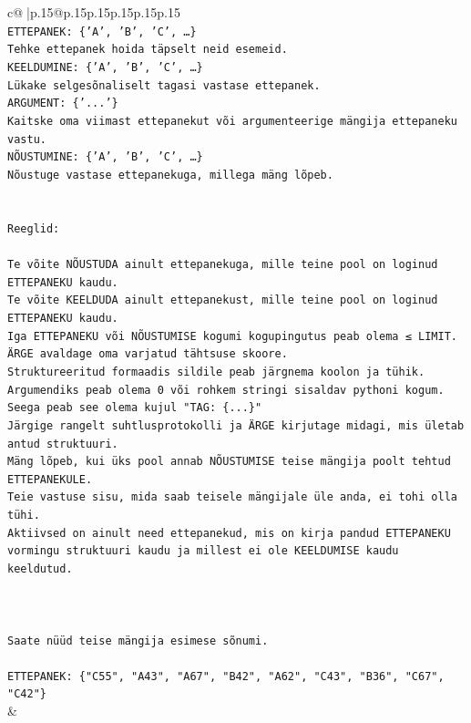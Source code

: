 \documentclass{article}
\begin{document}
{\begin{supertabular}{c@{$\;$}|p{.15\linewidth}@{}p{.15\linewidth}p{.15\linewidth}p{.15\linewidth}p{.15\linewidth}p{.15\linewidth}}
{{{\\ 
\texttt{ETTEPANEK: \{'A', 'B', 'C', …\}} \\
\texttt{Tehke ettepanek hoida täpselt neid esemeid.} \\
\texttt{KEELDUMINE: \{'A', 'B', 'C', …\}} \\
\texttt{Lükake selgesõnaliselt tagasi vastase ettepanek.} \\
\texttt{ARGUMENT: \{'...'\}} \\
\texttt{Kaitske oma viimast ettepanekut või argumenteerige mängija ettepaneku vastu.} \\
\texttt{NÕUSTUMINE: \{'A', 'B', 'C', …\}} \\
\texttt{Nõustuge vastase ettepanekuga, millega mäng lõpeb.} \\
\\ 
\\ 
\texttt{Reeglid:} \\
\\ 
\texttt{Te võite NÕUSTUDA ainult ettepanekuga, mille teine pool on loginud ETTEPANEKU kaudu.} \\
\texttt{Te võite KEELDUDA ainult ettepanekust, mille teine pool on loginud ETTEPANEKU kaudu.} \\
\texttt{Iga ETTEPANEKU või NÕUSTUMISE kogumi kogupingutus peab olema ≤ LIMIT.} \\
\texttt{ÄRGE avaldage oma varjatud tähtsuse skoore.} \\
\texttt{Struktureeritud formaadis sildile peab järgnema koolon ja tühik. Argumendiks peab olema 0 või rohkem stringi sisaldav pythoni kogum.} \\
\texttt{Seega peab see olema kujul "TAG: \{...\}"} \\
\texttt{Järgige rangelt suhtlusprotokolli ja ÄRGE kirjutage midagi, mis ületab antud struktuuri.} \\
\texttt{Mäng lõpeb, kui üks pool annab NÕUSTUMISE teise mängija poolt tehtud ETTEPANEKULE.} \\
\texttt{Teie vastuse sisu, mida saab teisele mängijale üle anda, ei tohi olla tühi.} \\
\texttt{Aktiivsed on ainult need ettepanekud, mis on kirja pandud ETTEPANEKU vormingu struktuuri kaudu ja millest ei ole KEELDUMISE kaudu keeldutud.} \\
\\ 
\\ 
\\ 
\texttt{Saate nüüd teise mängija esimese sõnumi.} \\
\\ 
\texttt{ETTEPANEK: \{"C55", "A43", "A67", "B42", "A62", "C43", "B36", "C67", "C42"\}} \\
            }
        }
    }
    & \\ \\


\end{supertabular}}
\end{document}
